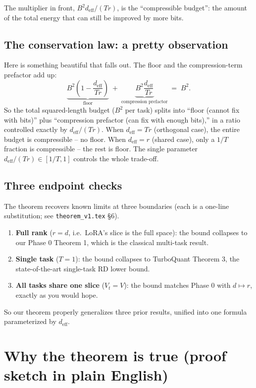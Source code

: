 \documentclass[11pt]{article}
\newcommand{\deff}{d_{\mathrm{eff}}}
\begin{document}
The multiplier in front, $B^2\deff/(Tr)$, is the ``compressible
budget'': the amount of the total energy that can still be improved by
more bits.

\subsection{The conservation law: a pretty observation}

Here is something beautiful that falls out. The floor and the
compression-term prefactor add up:
\[
  \underbrace{B^2\!\left(1 - \frac{\deff}{Tr}\right)}_{\text{floor}}
  \;+\;
  \underbrace{B^2\frac{\deff}{Tr}}_{\text{compression prefactor}}
  \;=\; B^2.
\]
So the total squared-length budget ($B^2$ per task) splits into
``floor (cannot fix with bits)'' plus ``compression prefactor (can fix
with enough bits),'' in a ratio controlled exactly by
$\deff / (Tr)$. When $\deff = Tr$ (orthogonal case), the entire budget
is compressible -- no floor. When $\deff = r$ (shared case), only a
$1/T$ fraction is compressible -- the rest is floor. The single
parameter $\deff / (Tr) \in [1/T, 1]$ controls the whole trade-off.

\subsection{Three endpoint checks}

The theorem recovers known limits at three boundaries (each is a
one-line substitution; see \texttt{theorem\_v1.tex} \S6).
\begin{enumerate}[nosep]
  \item \textbf{Full rank} ($r=d$, i.e.\ LoRA's slice is the full
        space): the bound collapses to our Phase 0 Theorem 1, which is
        the classical multi-task result.
  \item \textbf{Single task} ($T=1$): the bound collapses to
        TurboQuant Theorem 3, the state-of-the-art single-task RD lower
        bound.
  \item \textbf{All tasks share one slice} ($V_t = V$): the bound
        matches Phase 0 with $d \mapsto r$, exactly as you would hope.
\end{enumerate}
So our theorem properly generalizes three prior results, unified into
one formula parameterized by $\deff$.

\section{Why the theorem is true (proof sketch in plain English)}
\end{document}
